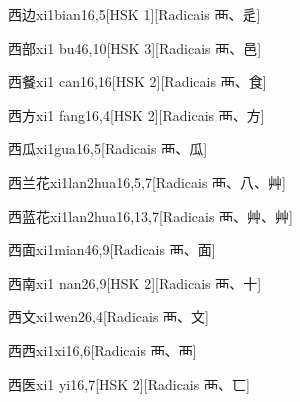 \begin{entry}{西边}{xi1bian1}{6,5}[HSK 1][Radicais ⾑、⾡]
\end{entry}

\begin{entry}{西部}{xi1 bu4}{6,10}[HSK 3][Radicais ⾑、⾢]
\end{entry}

\begin{entry}{西餐}{xi1 can1}{6,16}[HSK 2][Radicais ⾑、⾷]
\end{entry}

\begin{entry}{西方}{xi1 fang1}{6,4}[HSK 2][Radicais ⾑、⽅]
\end{entry}

\begin{entry}{西瓜}{xi1gua1}{6,5}[Radicais ⾑、⽠]
\end{entry}

\begin{entry}{西兰花}{xi1lan2hua1}{6,5,7}[Radicais ⾑、⼋、⾋]
\end{entry}

\begin{entry}{西蓝花}{xi1lan2hua1}{6,13,7}[Radicais ⾑、⾋、⾋]
\end{entry}

\begin{entry}{西面}{xi1mian4}{6,9}[Radicais ⾑、⾯]
\end{entry}

\begin{entry}{西南}{xi1 nan2}{6,9}[HSK 2][Radicais ⾑、⼗]
\end{entry}

\begin{entry}{西文}{xi1wen2}{6,4}[Radicais ⾑、⽂]
\end{entry}

\begin{entry}{西西}{xi1xi1}{6,6}[Radicais ⾑、⾑]
\end{entry}

\begin{entry}{西医}{xi1 yi1}{6,7}[HSK 2][Radicais ⾑、⼖]
\end{entry}

